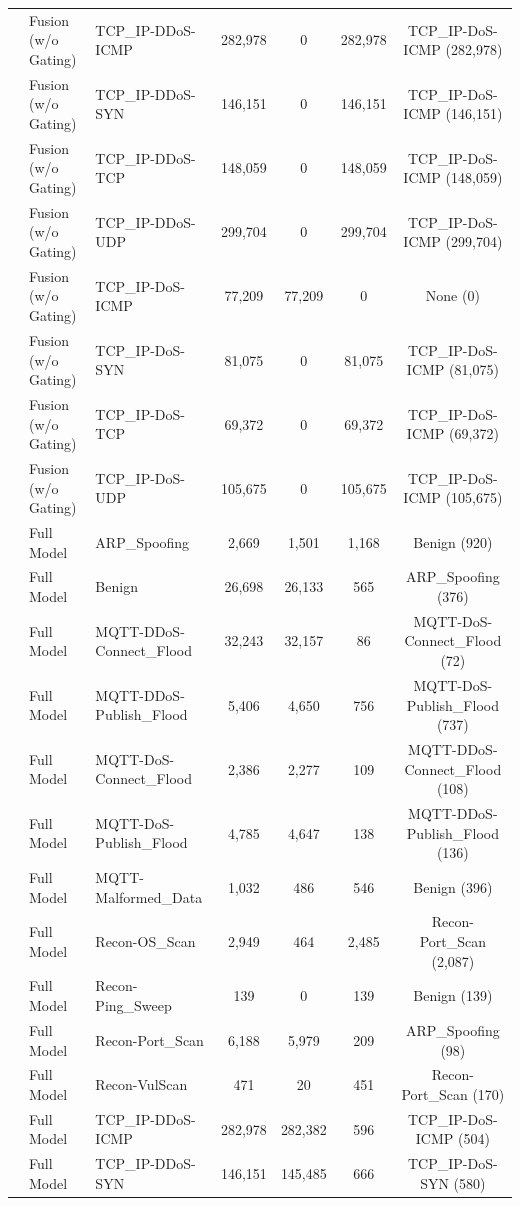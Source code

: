 \documentclass[a4paper,fleqn]{cas-sc}
\begin{document}
\begin{landscape}
\begin{longtable}{lllcccc}
 & Fusion (w/o Gating) & TCP\_IP-DDoS-ICMP & 282,978 & 0 & 282,978 & TCP\_IP-DoS-ICMP (282,978) \\
 & Fusion (w/o Gating) & TCP\_IP-DDoS-SYN & 146,151 & 0 & 146,151 & TCP\_IP-DoS-ICMP (146,151) \\
 & Fusion (w/o Gating) & TCP\_IP-DDoS-TCP & 148,059 & 0 & 148,059 & TCP\_IP-DoS-ICMP (148,059) \\
 & Fusion (w/o Gating) & TCP\_IP-DDoS-UDP & 299,704 & 0 & 299,704 & TCP\_IP-DoS-ICMP (299,704) \\
 & Fusion (w/o Gating) & TCP\_IP-DoS-ICMP & 77,209 & 77,209 & 0 & None (0) \\
 & Fusion (w/o Gating) & TCP\_IP-DoS-SYN & 81,075 & 0 & 81,075 & TCP\_IP-DoS-ICMP (81,075) \\
 & Fusion (w/o Gating) & TCP\_IP-DoS-TCP & 69,372 & 0 & 69,372 & TCP\_IP-DoS-ICMP (69,372) \\
 & Fusion (w/o Gating) & TCP\_IP-DoS-UDP & 105,675 & 0 & 105,675 & TCP\_IP-DoS-ICMP (105,675) \\
 & Full Model & ARP\_Spoofing & 2,669 & 1,501 & 1,168 & Benign (920) \\
 & Full Model & Benign & 26,698 & 26,133 & 565 & ARP\_Spoofing (376) \\
 & Full Model & MQTT-DDoS-Connect\_Flood & 32,243 & 32,157 & 86 & MQTT-DoS-Connect\_Flood (72) \\
 & Full Model & MQTT-DDoS-Publish\_Flood & 5,406 & 4,650 & 756 & MQTT-DoS-Publish\_Flood (737) \\
 & Full Model & MQTT-DoS-Connect\_Flood & 2,386 & 2,277 & 109 & MQTT-DDoS-Connect\_Flood (108) \\
 & Full Model & MQTT-DoS-Publish\_Flood & 4,785 & 4,647 & 138 & MQTT-DDoS-Publish\_Flood (136) \\
 & Full Model & MQTT-Malformed\_Data & 1,032 & 486 & 546 & Benign (396) \\
 & Full Model & Recon-OS\_Scan & 2,949 & 464 & 2,485 & Recon-Port\_Scan (2,087) \\
 & Full Model & Recon-Ping\_Sweep & 139 & 0 & 139 & Benign (139) \\
 & Full Model & Recon-Port\_Scan & 6,188 & 5,979 & 209 & ARP\_Spoofing (98) \\
 & Full Model & Recon-VulScan & 471 & 20 & 451 & Recon-Port\_Scan (170) \\
 & Full Model & TCP\_IP-DDoS-ICMP & 282,978 & 282,382 & 596 & TCP\_IP-DoS-ICMP (504) \\
 & Full Model & TCP\_IP-DDoS-SYN & 146,151 & 145,485 & 666 & TCP\_IP-DoS-SYN (580) \\

\end{longtable}
\end{landscape}
\end{document}
